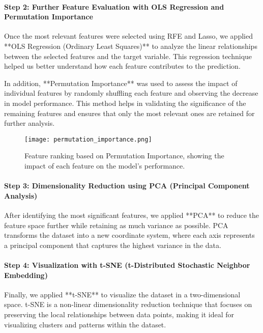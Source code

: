 \documentclass{article}
\begin{document}
\paragraph{Step 2: Further Feature Evaluation with OLS Regression and Permutation Importance}
Once the most relevant features were selected using RFE and Lasso, we applied **OLS Regression (Ordinary Least Squares)** to analyze the linear relationships between the selected features and the target variable. This regression technique helped us better understand how each feature contributes to the prediction. 

In addition, **Permutation Importance** was used to assess the impact of individual features by randomly shuffling each feature and observing the decrease in model performance. This method helps in validating the significance of the remaining features and ensures that only the most relevant ones are retained for further analysis.

\begin{figure}[h!]
    \centering
    \texttt{[image: permutation\_importance.png]}
    \caption{Feature ranking based on Permutation Importance, showing the impact of each feature on the model’s performance.}
\end{figure}

\paragraph{Step 3: Dimensionality Reduction using PCA (Principal Component Analysis)}
After identifying the most significant features, we applied **PCA** to reduce the feature space further while retaining as much variance as possible. PCA transforms the dataset into a new coordinate system, where each axis represents a principal component that captures the highest variance in the data.


\paragraph{Step 4: Visualization with t-SNE (t-Distributed Stochastic Neighbor Embedding)}
Finally, we applied **t-SNE** to visualize the dataset in a two-dimensional space. t-SNE is a non-linear dimensionality reduction technique that focuses on preserving the local relationships between data points, making it ideal for visualizing clusters and patterns within the dataset.
\end{document}
